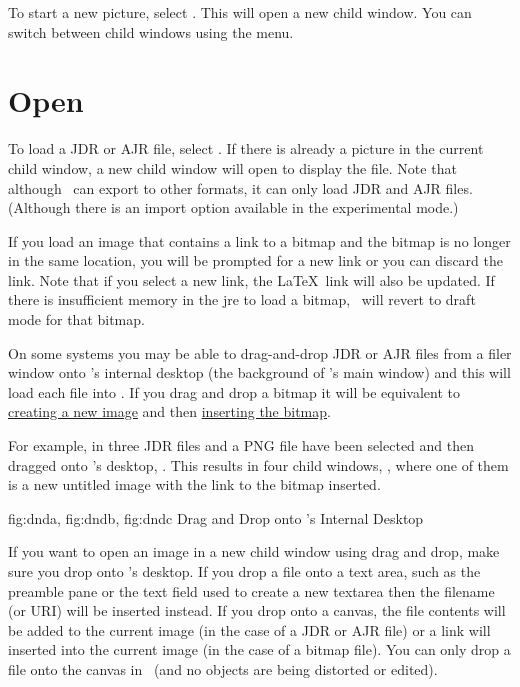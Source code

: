 
To start a new picture, select . This will open
a new child window. You can switch between child windows using the
 menu.

\section{Open}\label{sec:loadimage}


To load a \gls{JDR} or \gls{AJR} file, select .
If there is already a picture in the current child window, a new
child window will open to display the file. Note that although
\FlowframTk\ can export to other formats, it can only load
\gls{JDR} and \gls{AJR} files. (Although there is an import option
available in the experimental mode.)

If you load an image that contains a link to a \gls{bitmap} and
the bitmap is no longer in the same location, you will be prompted
for a new link or you can discard the link. Note that if you
select a new link, the \LaTeX\ link will also be updated.
If there is insufficient memory in the \gls{jre} to load a bitmap,
\FlowframTk\ will revert to draft mode for that bitmap.

On some systems you may be able to \gls{drag-and-drop} \gls{JDR} or
\gls{AJR} files from a filer window onto \FlowframTk's internal desktop
(the  background of \FlowframTk's main window) and this
will load each file into \FlowframTk. If you drag and drop a
\gls{bitmap} it will be equivalent to \hyperref[sec:newimage]{creating a
new image} and then \hyperref[sec:insertbitmap]{inserting the bitmap}.

For example, in  three \gls{JDR} files and
a PNG file have been selected and then dragged onto \FlowframTk's
desktop, . This results in four child
windows, , where one of them is a new
untitled image with the link to the \gls{bitmap} inserted.

{
  {fig:dnda}{}{},
  {fig:dndb}{}{},
  {fig:dndc}{}{}
}
{Drag and Drop onto \FlowframTk's Internal Desktop}

If you want to open an image in a new child window using drag and drop,
make sure you drop onto \FlowframTk's desktop. If you drop a file onto a
text area, such as the preamble pane or the text field used to
create a new \gls{textarea} then the filename (or URI) will be
inserted instead. If you drop onto a \gls{canvas}, the file contents
will be added to the current image (in the case of a \gls{JDR} or
\gls{AJR} file) or a link will inserted into the current image (in the
case of a \gls{bitmap} file). You can only drop a file onto the
\gls{canvas} in \selectmode\ (and no objects are being distorted or
edited).

